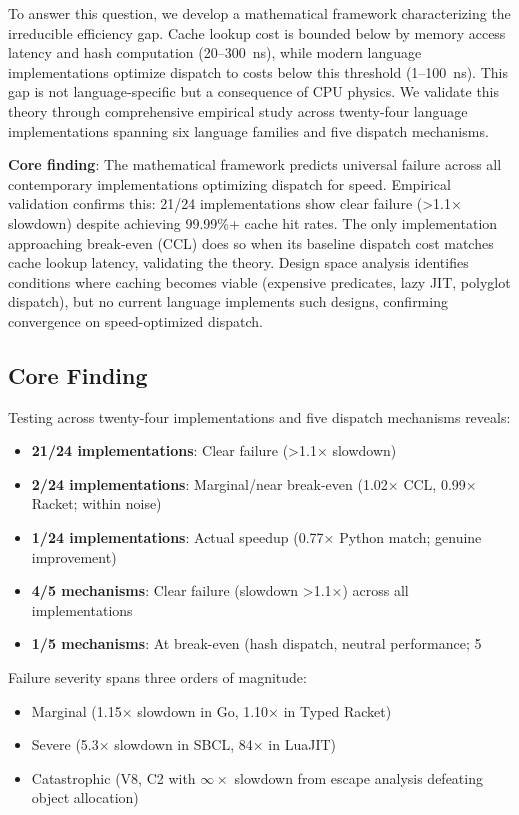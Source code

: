\documentclass[sigplan,final,acmsmall,review,screen]{acmart}
\begin{document}
To answer this question, we develop a mathematical framework characterizing the irreducible efficiency gap. Cache lookup cost is bounded below
by memory access latency and hash computation (20--300~ns), while modern language implementations optimize dispatch to costs below this threshold
(1--100~ns). This gap is not language-specific but a consequence of CPU physics. We validate this theory through comprehensive empirical study
across twenty-four language implementations spanning six language families and five dispatch mechanisms.

\textbf{Core finding}: The mathematical framework predicts universal failure across all contemporary implementations optimizing dispatch for speed.
Empirical validation confirms this: 21/24 implementations show clear failure (>1.1× slowdown) despite achieving 99.99\%+ cache hit rates.
The only implementation approaching break-even (CCL) does so when its baseline dispatch cost matches cache lookup latency,
validating the theory. Design space analysis identifies conditions where caching becomes viable (expensive predicates, lazy JIT, polyglot dispatch),
but no current language implements such designs, confirming convergence on speed-optimized dispatch.

\subsection{Core Finding}

Testing across twenty-four implementations and five dispatch mechanisms reveals:
\begin{itemize}
  \item \textbf{21/24 implementations}: Clear failure (>1.1× slowdown)
  \item \textbf{2/24 implementations}: Marginal/near break-even (1.02× CCL, 0.99× Racket; within noise)
  \item \textbf{1/24 implementations}: Actual speedup (0.77× Python match; genuine improvement)
  \item \textbf{4/5 mechanisms}: Clear failure (slowdown >1.1×) across all implementations
  \item \textbf{1/5 mechanisms}: At break-even (hash dispatch, neutral performance; 5%
\end{itemize}

Failure severity spans three orders of magnitude:
\begin{itemize}
  \item Marginal (1.15× slowdown in Go, 1.10× in Typed Racket)
  \item Severe (5.3× slowdown in SBCL, 84× in LuaJIT)
  \item Catastrophic (V8, C2 with $\infty \times$ slowdown from escape analysis defeating object allocation)
\end{itemize}
\end{document}
